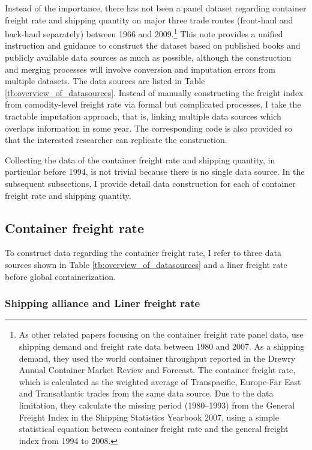 Instead of the importance, there has not been a panel dataset regarding container freight rate and shipping quantity on major three trade routes (front-haul and back-haul separately) between 1966 and 2009.\footnote{As other related papers focusing on the container freight rate panel data, \cite{luo2009econometric} use shipping demand and freight rate data between 1980 and 2007. As a shipping demand, they used the world container throughput reported in the Drewry Annual Container Market Review and Forecast. The container freight rate, which is calculated as the weighted average of Transpacific, Europe-Far East and Transatlantic trades from the same data source. Due to the data limitation, they calculate the missing period (1980–1993) from the General Freight Index in the Shipping Statistics Yearbook 2007, using a simple statistical equation between container freight rate and the general freight index from 1994 to 2008.}  This note provides a unified instruction and guidance to construct the dataset based on published books and publicly available data sources as much as possible, although the construction and merging processes will involve conversion and imputation errors from multiple datasets. The data sources are listed in Table \ref{tb:overview_of_datasources}. Instead of manually constructing the freight index from comodity-level freight rate via formal but complicated processes, I take the tractable imputation approach, that is, linking multiple data sources which overlaps information in some year. The corresponding code is also provided so that the interested researcher can replicate the construction.

Collecting the data of the container freight rate and shipping quantity, in particular before 1994, is not trivial because there is no single data source. In the subsequent subsections, I provide detail data construction for each of container freight rate and shipping quantity.

\subsection{Container freight rate}

To construct data regarding the container freight rate, I refer to three data sources shown in Table \ref{tb:overview_of_datasources} and a liner freight rate before global containerization.

\subsubsection{Shipping alliance and Liner freight rate}\label{subsec:shipping_alliance}

